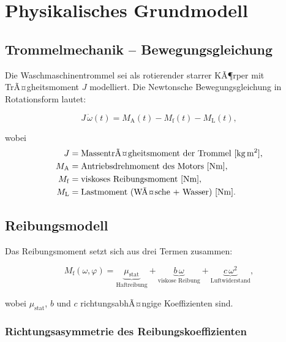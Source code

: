 ﻿\documentclass[12pt,a4paper]{article}
\theoremstyle{remark}
\begin{document}
	\section{Physikalisches Grundmodell}
	\label{sec:physik}
	
	\subsection{Trommelmechanik -- Bewegungsgleichung}
	
	Die Waschmaschinentrommel sei als rotierender starrer KÃ¶rper mit
	TrÃ¤gheitsmoment $J$ modelliert. Die Newtonsche Bewegungsgleichung in Rotationsform lautet:
	
	\begin{equation}
		J\,\dot{\omega}(t) = M_{\mathrm{A}}(t) - M_{\mathrm{f}}(t) - M_{\mathrm{L}}(t),
		\label{eq:newton}
	\end{equation}
	
	wobei
	\begin{align*}
		J           &= \text{MassentrÃ¤gheitsmoment der Trommel [kg\,m$^2$]},\\
		M_{\mathrm{A}}   &= \text{Antriebsdrehmoment des Motors [Nm]},\\
		M_{\mathrm{f}}   &= \text{viskoses Reibungsmoment [Nm]},\\
		M_{\mathrm{L}}   &= \text{Lastmoment (WÃ¤sche + Wasser) [Nm]}.
	\end{align*}
	
	\subsection{Reibungsmodell}
	
	Das Reibungsmoment setzt sich aus drei Termen zusammen:
	
	\begin{equation}
		M_{\mathrm{f}}(\omega, \varphi) = \underbrace{\mu_{\mathrm{stat}}}_{\text{Haftreibung}}
		+ \underbrace{b\,\omega}_{\text{viskose Reibung}}
		+ \underbrace{c\,\omega^2}_{\text{Luftwiderstand}},
		\label{eq:reibung}
	\end{equation}
	
	wobei $\mu_{\mathrm{stat}}$, $b$ und $c$ richtungsabhÃ¤ngige Koeffizienten sind.
	
	\subsubsection{Richtungsasymmetrie des Reibungskoeffizienten}
	
\end{document}
